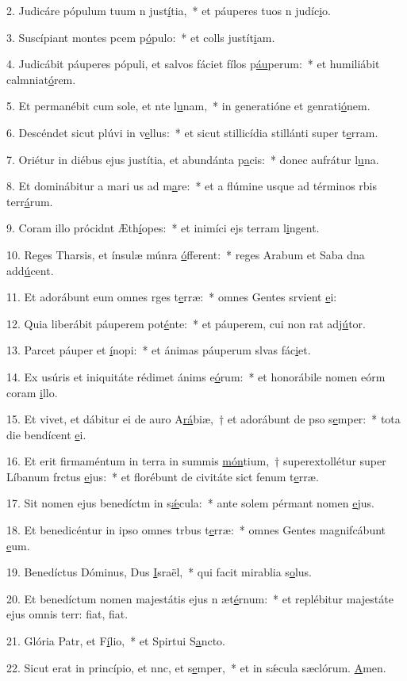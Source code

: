 2. Judicáre pópulum tuum n just\uline{í}tia,~* et páuperes tuos n judíc\uline{i}o.\par 
3. Suscípiant montes pcem p\uline{ó}pulo:~* et colls justít\uline{i}am.\par 
4. Judicábit páuperes pópuli, et salvos fáciet fílos p\uline{áu}perum:~* et humiliábit calmniat\uline{ó}rem.\par 
5. Et permanébit cum sole, et nte l\uline{u}nam,~* in generatióne et genrati\uline{ó}nem.\par 
6. Descéndet sicut plúvi in v\uline{e}llus:~* et sicut stillicídia stillánti super t\uline{e}rram.\par 
7. Oriétur in diébus ejus justítia, et abundánta p\uline{a}cis:~* donec aufrátur l\uline{u}na.\par 
8. Et dominábitur a mari us ad m\uline{a}re:~* et a flúmine usque ad términos rbis terr\uline{á}rum.\par 
9. Coram illo prócidnt Æth\uline{í}opes:~* et inimíci ejs terram l\uline{i}ngent.\par 
10. Reges Tharsis, et ínsulæ múnra \uline{ó}fferent:~* reges Arabum et Saba dna add\uline{ú}cent.\par 
11. Et adorábunt eum omnes rges t\uline{e}rræ:~* omnes Gentes srvient \uline{e}i:\par 
12. Quia liberábit páuperem  pot\uline{é}nte:~* et páuperem, cui non rat adj\uline{ú}tor.\par 
13. Parcet páuper et \uline{í}nopi:~* et ánimas páuperum slvas fác\uline{i}et.\par 
14. Ex usúris et iniquitáte rédimet ánims e\uline{ó}rum:~* et honorábile nomen eórm coram \uline{i}llo.\par 
15. Et vivet, et dábitur ei de auro A\uline{rá}biæ,~† et adorábunt de pso s\uline{e}mper:~* tota die bendícent \uline{e}i.\par 
16. Et erit firmaméntum in terra in summis \uline{món}tium,~† superextollétur super Líbanum frctus \uline{e}jus:~* et florébunt de civitáte sict fenum t\uline{e}rræ.\par 
17. Sit nomen ejus benedíctm in s\uline{ǽ}cula:~* ante solem pérmant nomen \uline{e}jus.\par 
18. Et benedicéntur in ipso omnes trbus t\uline{e}rræ:~* omnes Gentes magnifcábunt \uline{e}um.\par 
19. Benedíctus Dóminus, Dus \uline{I}sraël,~* qui facit mirablia s\uline{o}lus.\par 
20. Et benedíctum nomen majestátis ejus n æt\uline{é}rnum:~* et replébitur majestáte ejus omnis terr: fiat, f\uline{i}at.\par 
21. Glória Patr, et F\uline{í}lio,~* et Spirtui S\uline{a}ncto.\par 
22. Sicut erat in princípio, et nnc, et s\uline{e}mper,~* et in sǽcula sæclórum. \uline{A}men.\par 
